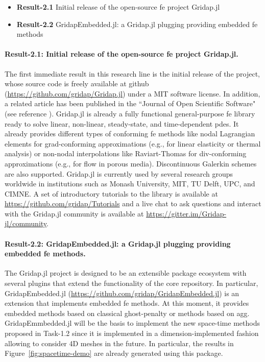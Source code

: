 \documentclass{article}
\begin{document}
\begin{itemize}
\item {\bf Result-2.1} Initial release of the open-source \ac{fe} project Gridap.jl
\item {\bf Result-2.2} GridapEmbedded.jl: a Gridap.jl plugging providing embedded \ac{fe} methods
\end{itemize}

\paragraph*{Result-2.1: Initial release of the open-source \ac{fe} project Gridap.jl.} 

The first immediate result in this research line is the initial release of the project, whose source code is freely available at github (\url{https://github.com/gridap/Gridap.jl}) under a MIT software license. In addition, a related article  {has been published in the ``Journal of Open Scientific Software"} (see reference \cite{Badia2020}). Gridap.jl is already a fully functional general-purpose \ac{fe} library ready to solve linear, non-linear, steady-state, and time-dependent \acp{pde}. It already provides different types of conforming \ac{fe} methods like nodal Lagrangian elements for grad-conforming approximations (e.g., for linear elasticity or thermal analysis) or non-nodal interpolations like Raviart-Thomas for div-conforming approximations (e.g., for flow in porous media). Discontinuous Galerkin schemes are also supported. Gridap.jl is currently used by several research groups worldwide in institutions such as Monash University, MIT, TU Delft, UPC, and CIMNE. A set of introductory tutorials to the library is available at \url{https://github.com/gridap/Tutorials} and a live chat to ask questions and interact with the Gridap.jl community is available at \url{https://gitter.im/Gridap-jl/community}.

\paragraph*{Result-2.2: GridapEmbedded.jl: a Gridap.jl plugging providing embedded \ac{fe} methods.}

The Gridap.jl project is designed to be an extensible package ecosystem with several plugins that extend the functionality of the core repository. In particular, GridapEmbedded.jl (\url{https://github.com/gridap/GridapEmbedded.jl}) is an extension that implements embedded \ac{fe} methods. At this moment, it provides embedded methods based on classical ghost-penalty \cite{burman_cutfem:_2015} or methods based on \ac{agg}. GridapEmmbedded.jl will be the basis to implement the new space-time methods proposed in Task-1.2 since it is implemented in a dimension-implemented fashion allowing to consider 4D meshes in the future.  In particular, the results in Figure~\ref{fig:spacetime-demo} are already generated using this package.
\end{document}
